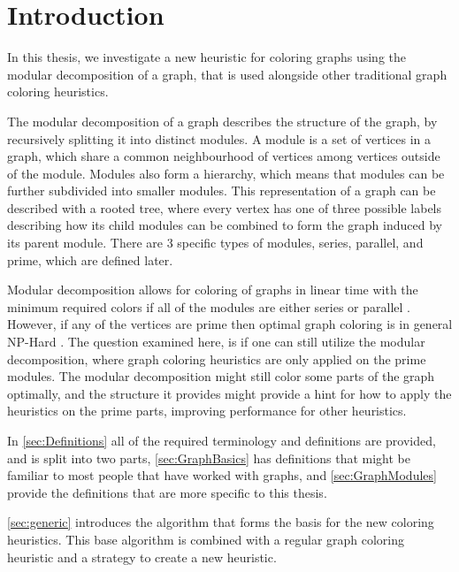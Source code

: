 \documentclass[a4paper]{article}
\begin{document}


\newpage 
\tableofcontents


\section{Introduction}


In this thesis, we investigate a new heuristic for coloring graphs using the
modular decomposition of a graph, that is used alongside other traditional
graph coloring heuristics.

The modular decomposition of a graph describes the structure of the graph, by
recursively splitting it into distinct modules. A module is a set of vertices
in a graph, which share a common neighbourhood of vertices among vertices
outside of the module. Modules also form a hierarchy, which means that modules
can be further subdivided into smaller modules. This representation of a graph
can be described with a rooted tree, where every vertex has one of three
possible labels describing how its child modules can be combined to form the
graph induced by its parent module. There are 3 specific types of modules,
series, parallel, and prime, which are defined later.

Modular decomposition allows for coloring of graphs in linear time with the
minimum required colors if all of the modules are either  series or parallel
\cite{HCL}. However, if any of the vertices are prime then optimal graph
coloring is in general NP-Hard \cite{NPHard}. The question examined here, is if
one can still utilize the modular decomposition, where graph coloring
heuristics are only applied on the prime modules. The modular decomposition
might still color some parts of the graph optimally, and the structure it
provides might provide a hint for how to apply the heuristics on the prime
parts, improving performance for other heuristics.

In \autoref{sec:Definitions} all of the required terminology and definitions are
provided, and is split into two parts, \autoref{sec:GraphBasics} has definitions that might be
familiar to most people that have worked with graphs, and
\autoref{sec:GraphModules} provide the definitions that are more specific to
this thesis.

\autoref{sec:generic} introduces the algorithm that forms the basis for the new coloring heuristics.
This base algorithm is combined with a regular graph coloring heuristic and a strategy to create a
new heuristic.
\end{document}
